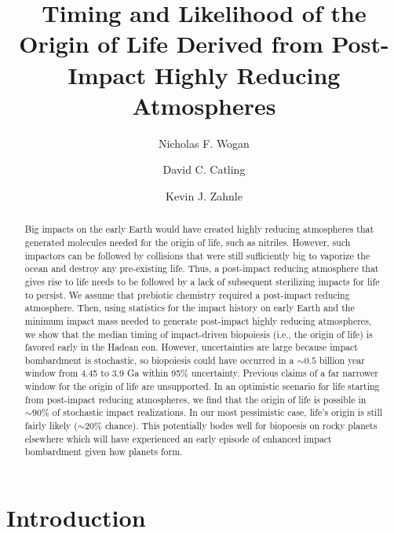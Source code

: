 \documentclass[manuscript]{aastex63}
\begin{document}
\title{Timing and Likelihood of the Origin of Life Derived from Post-Impact Highly Reducing Atmospheres}

\author{Nicholas F. Wogan}

\author{David C. Catling}

\author{Kevin J. Zahnle}

\begin{abstract}
Big impacts on the early Earth would have created highly reducing atmospheres that generated molecules needed for the origin of life, such as nitriles. However, such impactors can be followed by collisions that were still sufficiently big to vaporize the ocean and destroy any pre-existing life. Thus, a post-impact reducing atmosphere that gives rise to life needs to be followed by a lack of subsequent sterilizing impacts for life to persist. We assume that prebiotic chemistry required a post-impact reducing atmosphere. Then, using statistics for the impact history on early Earth and the minimum impact mass needed to generate post-impact highly reducing atmospheres, we show that the median timing of impact-driven biopoiesis (i.e., the origin of life) is favored early in the Hadean eon. However, uncertainties are large because impact bombardment is stochastic, so biopoiesis could have occurred in a $\sim 0.5$ billion year window from 4.45 to 3.9 Ga within 95\% uncertainty. Previous claims of a far narrower window for the origin of life are unsupported. In an optimistic scenario for life starting from post-impact reducing atmospheres, we find that the origin of life is possible in $\sim 90\%$ of stochastic impact realizations. In our most pessimistic case, life's origin is still fairly likely ($\sim 20\%$ chance). This potentially bodes well for biopoesis on rocky planets elsewhere which will have experienced an early episode of enhanced impact bombardment given how planets form.
\end{abstract}

\section{Introduction}
\end{document}
